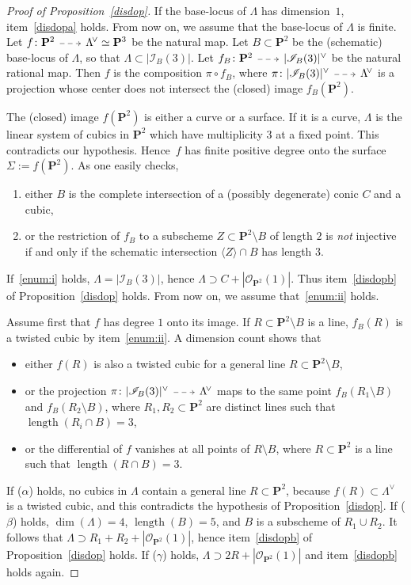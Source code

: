 \documentclass[11pt]{article}
\makeatletter
\let\mathcal\mathscr
\newenvironment{enumeratei}
{\bgroup\def\theenumi{\roman{enumi}}\def\theenumii{\arabic{enumii}}\begin{enumerate}}
{\end{enumerate}\egroup}
\newcommand{\dradpl}{{\!\!\xymatrix@C=8mm{\ar@{-->}[r]&}\!\!}}
\newcommand{\dratst}{{\,\mathrel{\scalebox{.8}{$\dradpl$}}\,}}
\newcommand{\drascst}{{\,\mathrel{\scalebox{.6}{$\dradpl$}}\,}}
\newcommand{\dra}{\mathchoice{\dradpl}{\dratst}{\drascst}{\drascst}}
\theoremstyle{definition}
\renewcommand\P{{\mathbf P}}\let\PP\P
\newcommand\cI{\mathcal{I}}
\newcommand\cO{\mathcal{O}}\let\OO\cO
\let\la\langle
\let\ra\rangle
\let\cong\simeq
\DeclareMathOperator{\len}{length}
\renewcommand{\dratst}{\mathrel{\scalebox{.8}{$\dradpl$}}}
\renewcommand{\drascst}{\mathrel{\scalebox{.6}{$\dradpl$}}}
\makeatother
\begin{document}
\begin{proof}[Proof of Proposition~\ref{disdop}]
If the base-locus of $\Lambda$ has dimension~$1$, item~\eqref{disdopa} holds. From now on, we assume that the base-locus of $\Lambda$ is finite.
Let $f\colon\PP^2\dra \Lambda^{\!\vee}\cong\PP^3$ be the natural map. Let $ B\subset\PP^2$ be the (schematic) base-locus of $\Lambda$, so that $\Lambda\subset|\cI_{B}(3)|$. Let $f_{B}\colon\PP^2\dra |\cI_{B}(3)|^{\vee}$ be the natural rational map. Then $f$ is the composition $\pi\circ f_{B}$, where $\pi\colon |\cI_{B}(3)|^{\vee}\dra \Lambda^{\!\vee}$ is a projection whose center does not intersect the (closed) image $f_{B}(\P^2)$.

The (closed) image $f(\P^2)$ is either a curve or a surface.
If it is a curve, $\Lambda$ is the linear system of cubics in $\PP^2$ which have multiplicity $3$ at a fixed point. This contradicts our hypothesis.
Hence~$f$ has finite positive degree onto the surface
$\Sigma:=f(\P^2)$.
As one easily checks,
\begin{enumeratei}
\item\label{enum:i}
either ${B}$ is the complete intersection of a (possibly degenerate) conic $C$ and a cubic,
\item\label{enum:ii}
or the restriction of $f_{B}$ to a subscheme $Z\subset \P^2\setminus B$ of length $2$ is \emph{not} injective
if and only if the schematic intersection $\la Z\ra \cap{B}$ has length $3$.
\end{enumeratei}
If~\eqref{enum:i} holds, $\Lambda=|\cI_{B}(3)|$, hence $\Lambda\supset C+|\cO_{\PP^2}(1)|$. Thus item~\eqref{disdopb} of Proposition~\ref{disdop} holds. From now on, we assume that~\eqref{enum:ii} holds.

Assume first that $f$ has degree $1$ onto its image. If $R\subset\PP^2\setminus {B}$ is a line, $f_{B}(R)$ is a twisted cubic by item~\eqref{enum:ii}. A dimension count shows that
\begin{itemize}
\item[($\alpha$)]
either $f(R)$ is also a twisted cubic for a general line $R\subset \PP^2\setminus {B}$,
\item[($\beta$)]
or
the projection $\pi\colon |\cI_{B}(3)|^{\vee}\dra \Lambda^{\!\vee}$ maps to the same point $f_{B}(R_1\setminus{B})$ and $f_{B}(R_2\setminus{B})$, where $R_1,R_2\subset\PP^2$ are distinct lines such that $\len(R_i\cap{B})=3$,
\item[($\gamma$)]
or
the differential of $f$ vanishes at all points of $R\setminus{B}$, where $R\subset\PP^2$ is a line such that $\len(R\cap{B})=3$.
\end{itemize}
If ($\alpha$) holds, no cubics in $\Lambda$ contain a general line $R\subset\PP^2$, because $f(R)\subset\Lambda^{\!\vee}$ is a twisted cubic, and this contradicts the hypothesis of Proposition~\ref{disdop}. If ($\beta$) holds, $\dim(\Lambda)=4$, $\len({B})=5$, and ${B}$ is a subscheme of $R_1\cup R_2$. It follows that $\Lambda\supset R_1+R_2+|\cO_{\PP^2}(1)|$, hence
item~\eqref{disdopb} of Proposition~\ref{disdop} holds. If ($\gamma$) holds, $\Lambda\supset 2R+|\cO_{\PP^2}(1)|$ and item~\eqref{disdopb} holds again.


\end{proof}
\end{document}
